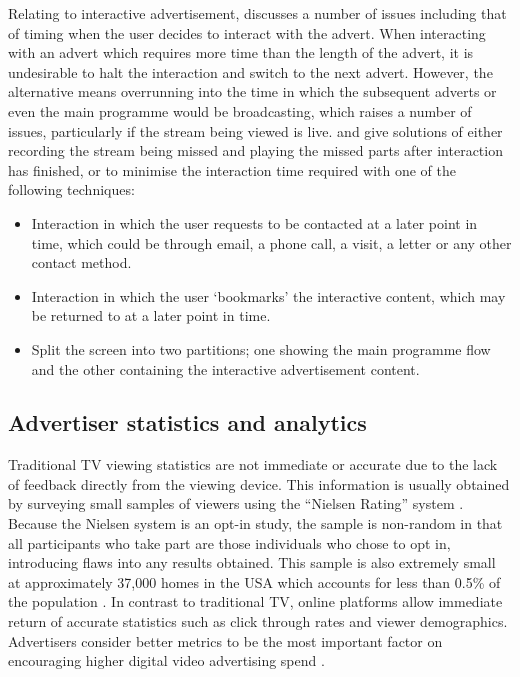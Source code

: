 	Relating to interactive advertisement, \citet{integrated-approach-advertising} discusses a number of issues including that of timing when the user decides to interact with the advert. When interacting with an advert which requires more time than the length of the advert, it is undesirable to halt the interaction and switch to the next advert. However, the alternative means overrunning into the time in which the subsequent adverts or even the main programme would be broadcasting, which raises a number of issues, particularly if the stream being viewed is live. \citet{integrated-approach-advertising} and \citet{personalised_interactive_tv_advertising} give solutions of either recording the stream being missed and playing the missed parts after interaction has finished, or to minimise the interaction time required with one of the following techniques:
	\begin{itemize}
		\item Interaction in which the user requests to be contacted at a later point in time, which could be through email, a phone call, a visit, a letter or any other contact method.
		\item Interaction in which the user `bookmarks' the interactive content, which may be returned to at a later point in time.
		\item Split the screen into two partitions; one showing the main programme flow and the other containing the interactive advertisement content. 
	\end{itemize}



	

\subsection{Advertiser statistics and analytics}
	\label{sec:background_stats}

	Traditional TV viewing statistics are not immediate or accurate due to the lack of feedback directly from the viewing device. This information is usually obtained by surveying small samples of viewers using the ``Nielsen Rating'' system \citep{nielsen-sample}. Because the Nielsen system is an opt-in study, the sample is non-random in that all participants who take part are those individuals who chose to opt in, introducing flaws into any results obtained. This sample is also extremely small at approximately 37,000 homes in the USA which accounts for less than 0.5\% of the population \citep{nielsen-sample}. In contrast to traditional TV, online platforms allow immediate return of accurate statistics such as click through rates and viewer demographics. Advertisers consider better metrics to be the most important factor on encouraging higher digital video advertising spend \citep{brightroll-report}.


